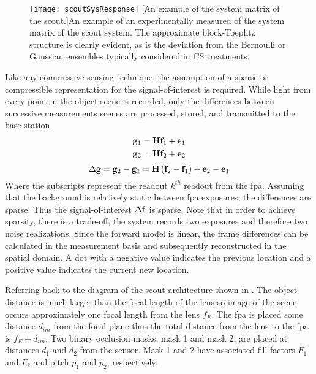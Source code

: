 \begin{sidewaysfigure}
	\texttt{[image: scoutSysResponse]}
	[An example of the system matrix of the \gls{scout}.]{An example of an experimentally measured of the system matrix of the \gls{scout} system. The approximate block-Toeplitz structure is clearly evident, as is the deviation from the Bernoulli or Gaussian ensembles typically considered in CS treatments. }
	\label{fig:scoutSysResponse}
\end{sidewaysfigure}

Like any compressive sensing technique, the assumption of a sparse or compressible representation for the signal-of-interest is required. While light from every point in the object scene is recorded, only the differences between successive measurements scenes are processed, stored, and transmitted to the base station
%
\begin{equation} 
\begin{split}
	\mathbf{g}_1 &= \mathbf{H} \mathbf{f}_1 + \mathbf{e}_1 \\
	\mathbf{g}_2 &= \mathbf{H} \mathbf{f}_2 + \mathbf{e}_2
\end{split}
\end{equation}
%
\begin{equation}
	\Delta \mathbf{g} = \mathbf{g}_2 - \mathbf{g}_1 = \mathbf{H} \left(  \mathbf{f}_2 - \mathbf{f}_1  \right) + \mathbf{e}_2 - \mathbf{e}_1 
\end{equation}
%
Where the subscripts represent the readout $k^{th}$ readout from the \gls{fpa}. Assuming that the background is relatively static between \gls{fpa} exposures, the differences are sparse. Thus the signal-of-interest $\Delta \mathbf{f}$ is sparse. Note that in order to achieve sparsity, there is a trade-off, the system records two exposures and therefore two noise realizations. Since the forward model is linear, the frame differences can be calculated in the measurement basis and subsequently reconstructed in the spatial domain. A dot with a negative value indicates the previous location and a positive value indicates the current new location. 

Referring back to the diagram of the \gls{scout} architecture shown in . The object distance is much larger than the focal length of the lens so image of the scene occurs approximately one focal length from the lens $f_E$. The \gls{fpa} is placed some distance $d_{im}$ from the focal plane thus the total distance from the lens to the \gls{fpa} is $f_E + d_{im}$. Two binary occlusion masks, mask 1 and mask 2, are placed at distances $d_1$ and $d_2$ from the sensor. Mask 1 and 2 have associated fill factors $F_1$ and $F_2$ and pitch $p_1$ and $p_2$, respectively. 


